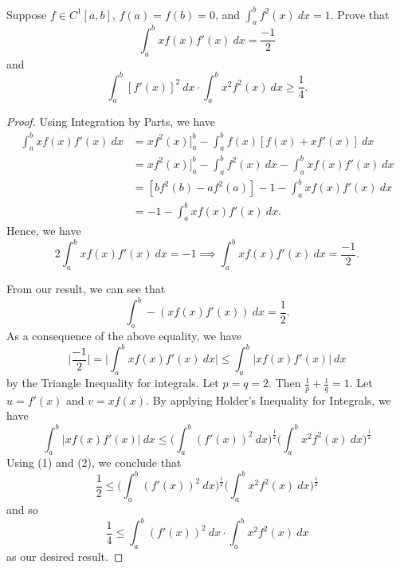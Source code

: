 \documentclass[a4paper]{article}
\begin{document}
\begin{problem}
    Suppose \( f \in C^{1}[a,b] \), \( f(a) = f(b) = 0  \), and \( \int_{ a }^{ b } f^{2}(x) \ dx  = 1  \). Prove that  
    \[  \int_{ a }^{ b } x f(x) f'(x) \ dx = \frac{ -1 }{ 2 }  \]
    and
    \[  \int_{ a }^{ b } [f'(x)]^{2} \ dx \cdot \int_{ a }^{ b }  x^{2} f^{2}(x)  \ dx \geq \frac{ 1 }{ 4 }. \]
\end{problem}
\begin{proof}
Using Integration by Parts, we have 
\begin{align*}
\int_{ a }^{ b } x f(x) f'(x) \ dx &= x f^{2}(x) \Big]_{a}^{b} - \int_{ a }^{ b }  f(x) [f(x)  + x f'(x)] \ dx  \\
                                   &= x f^{2}(x) \Big]_{a}^{b} - \int_{ a }^{ b } f^{2}(x) \ dx - \int_{ a }^{ b }  x f(x) f'(x) \ dx \\
                                   &= [ b f^{2}(b) - a f^{2}(a)] - 1 - \int_{ a }^{ b }  x f(x) f'(x)  \ dx  \\ 
                                   &= -1 - \int_{ a }^{ b }  x f(x) f'(x) \ dx.
\end{align*}
Hence, we have 
\[  2 \int_{ a }^{ b }  x f(x) f'(x) \ dx = -1 \implies \int_{ a }^{ b }  x f(x) f'(x) \ dx = \frac{ -1 }{ 2 }. \]

From our result, we can see that 
\[  \int_{ a }^{ b }  - (x f(x) f'(x))  \ dx  = \frac{ 1 }{ 2 }.  \]
As a consequence of the above equality, we have 
\[  \Big| \frac{ -1 }{ 2 }  \Big|  = \Big| \int_{ a }^{ b } x f(x) f'(x) \ dx  \Big| \leq \int_{ a }^{ b }  | x f(x) f'(x) |   \ dx  \]
by the Triangle Inequality for integrals.
Let \( p = q = 2 \). Then \( \frac{ 1 }{ p }  + \frac{ 1 }{ q }  = 1  \). Let \( u = f'(x) \) and \( v = x f(x) \). By applying Holder's Inequality for Integrals, we have 
\[  \int_{ a }^{ b }   | x f(x) f'(x) |   \ d x \leq \Big(  \int_{ a }^{ b }  (f'(x))^{2} \ dx  \Big)^{\frac{ 1 }{ 2 } } \Big(  \int_{ a }^{ b }  x^{2} f^{2}(x) \ dx \Big)^{\frac{ 1 }{ 2 }} \tag{2} \]
Using (1) and (2), we conclude that 
\[  \frac{ 1 }{ 2 }  \leq \Big(  \int_{ a }^{ b }  (f'(x))^{2} \ dx  \Big)^{\frac{ 1 }{ 2 }} \Big(  \int_{ a }^{ b }  x^{2} f^{2}(x) \ d x  \Big)^{\frac{ 1 }{ 2 }} \]
and so 
\[  \frac{ 1 }{ 4 }  \leq \int_{ a }^{ b }  (f'(x))^{2} \ d x \cdot \int_{ a }^{ b } x^{2} f^{2}(x) \ dx \]
as our desired result.
\end{proof}
\end{document}
